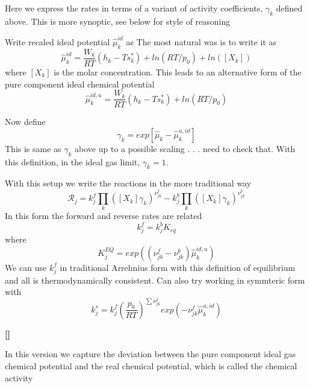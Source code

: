 \documentclass[11pt]{article}
\newcommand{\jbb}[1]{{\bf[{\color{red}{JBB:  #1}}]}}
\begin{document}
Here we express the rates in terms of a variant of activity coefficients, $\gamma_k$ defined above.
This is more synoptic, see below for style of reasoning

Write recaled ideal potential  $\hat{\mu}_k^{id}$ as
The most natural was is to write it as
\begin{equation}
\hat{\mu}_k^{id} = \frac{W_k}{R T} (h_k - T s_k^* )+ ln(RT/p_0) + ln([X_k])
\end{equation}
where $[X_k]$ is the molar concentration.
This leads to an alternative form of the pure component ideal chemical potential
\begin{equation}
\hat{\mu}_k^{id,u} = \frac{W_k}{R T} (h_k - T s_k^* )+ ln(RT/p_0) 
\label{eq:chem_uid_conc}
\end{equation}

Now define
\begin{equation}
\gamma_k = exp[\hat{\mu}_k - \hat{\mu}_k^{u,id}]
\label{eq:deviate_ideal}
\end{equation}
This is same as $\gamma_k$ above up to a possible scaling . . . need to check that.
With this definition, in the ideal gas limit, $\gamma_k = 1$.

With this setup we write the reactions in the more traditional way
\begin{equation}
\mathcal{R}_j = k_j^f \prod_k ([X_k]\gamma_k)^{\nu_{jk}^f}
- k_j^b \prod_k ([X_k] \gamma_k)^{\nu_{jk}^b}
\end{equation}
In this form the forward and reverse rates are related
\begin{equation}
 k_j^f = k_j^b K_{eq}
\end{equation}
where
\begin{equation}
K_j^{EQ} = 
exp( (\nu_{jk}^f - \nu_{jk}^b) \hat{\mu}_k^{id,u})
\label{eq:kin_equil_trad}
\end{equation}
We can use $k_j^f$ in traditional Arrehnius form with this definition of equilibrium and all is thermodynamically
consistent.  Can also try working in symmteric form with
\[
k_j^s =  k_j^f 
\left ( \frac{p_0}{R T}  \right )^{\sum \nu_{jk}^f }exp( -\nu_{jk}^f \hat{\mu}_k^{u,id})
\]

\jbb{old Stuff}

In this version we capture the deviation between the pure component ideal gas chemical potential and
the real chemical potential, which is called the chemical activity
\end{document}
